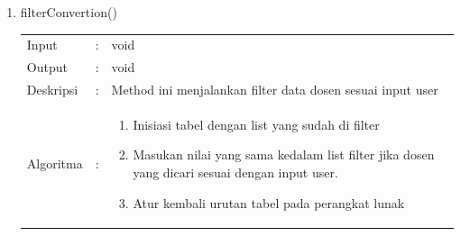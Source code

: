 \begin{enumerate}
	\item filterConvertion()\\
	\begin{tabular}{l c p{9cm}}
		Input & : & void\\ 
		Output & : & void \\ 
		Deskripsi & : & Method ini menjalankan filter data dosen sesuai input user\\
		Algoritma & : & 
			\begin{enumerate}
				\item Inisiasi tabel dengan list yang sudah di filter
				\item Masukan nilai yang sama kedalam list filter jika dosen yang dicari sesuai dengan input user.
				\item Atur kembali urutan tabel pada perangkat lunak
			\end{enumerate}
		\end{tabular}	
\end{enumerate}

